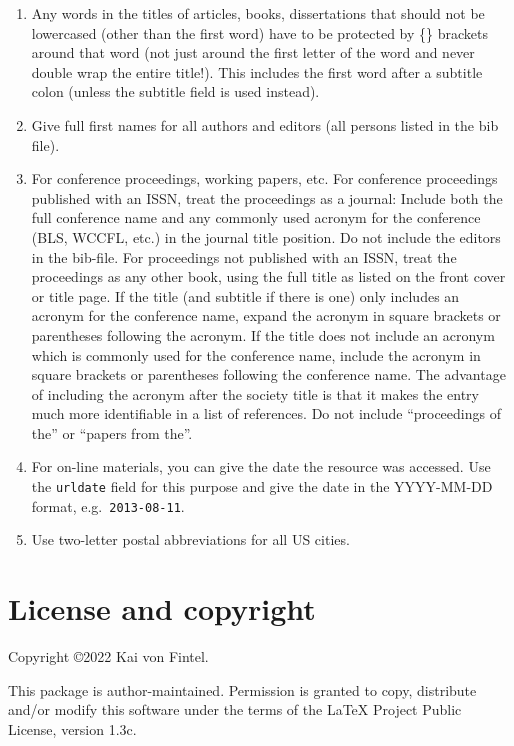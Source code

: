 \documentclass[
]{article}
\providecommand{\tightlist}{%
  \setlength{\itemsep}{0pt}\setlength{\parskip}{0pt}}
\begin{document}
\begin{enumerate}
\def\labelenumi{\arabic{enumi}.}
\tightlist
\item
  Any words in the titles of articles, books, dissertations that should
  not be lowercased (other than the first word) have to be protected by
  \{\} brackets around that word (not just around the first letter of
  the word and never double wrap the entire title!). This includes the
  first word after a subtitle colon (unless the subtitle field is used
  instead).
\item
  Give full first names for all authors and editors (all persons listed
  in the bib file).
\item
  For conference proceedings, working papers, etc. For conference
  proceedings published with an ISSN, treat the proceedings as a
  journal: Include both the full conference name and any commonly used
  acronym for the conference (BLS, WCCFL, etc.) in the journal title
  position. Do not include the editors in the bib-file. For proceedings
  not published with an ISSN, treat the proceedings as any other book,
  using the full title as listed on the front cover or title page. If
  the title (and subtitle if there is one) only includes an acronym for
  the conference name, expand the acronym in square brackets or
  parentheses following the acronym. If the title does not include an
  acronym which is commonly used for the conference name, include the
  acronym in square brackets or parentheses following the conference
  name. The advantage of including the acronym after the society title
  is that it makes the entry much more identifiable in a list of
  references. Do not include ``proceedings of the'' or ``papers from
  the''.
\item
  For on-line materials, you can give the date the resource was
  accessed. Use the \texttt{urldate} field for this purpose and give the
  date in the YYYY-MM-DD format, e.g.~\texttt{2013-08-11}.
\item
  Use two-letter postal abbreviations for all US cities.
\end{enumerate}

\hypertarget{license-and-copyright}{%
\section{License and copyright}\label{license-and-copyright}}

Copyright ©2022 Kai von Fintel.

This package is author-maintained. Permission is granted to copy,
distribute and/or modify this software under the terms of the LaTeX
Project Public License, version 1.3c.
\end{document}
